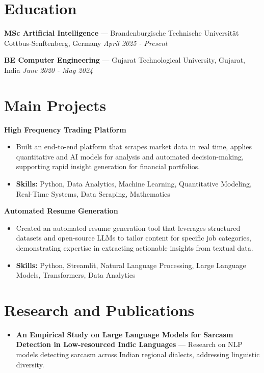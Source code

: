 \documentclass[a4paper,10pt]{article}
\begin{document}
\section*{Education}
\textbf{MSc Artificial Intelligence} — Brandenburgische Technische Universität Cottbus-Senftenberg, Germany \hfill \textit{April 2025 - Present}\par
\vspace{1.5pt}
\textbf{BE Computer Engineering} — Gujarat Technological University, Gujarat, India \hfill \textit{June 2020 - May 2024}\par

\section*{Main Projects}
\textbf{High Frequency Trading Platform}\par
\vspace{1pt}
\begin{itemize}
  \item Built an end-to-end platform that scrapes market data in real time, applies quantitative and AI models for analysis and automated decision-making, supporting rapid insight generation for financial portfolios.
  \item \textbf{Skills:} Python, Data Analytics, Machine Learning, Quantitative Modeling, Real-Time Systems, Data Scraping, Mathematics
\end{itemize}
\vspace{3pt}
\textbf{Automated Resume Generation}\par
\vspace{1pt}
\begin{itemize}
  \item Created an automated resume generation tool that leverages structured datasets and open-source LLMs to tailor content for specific job categories, demonstrating expertise in extracting actionable insights from textual data.
  \item \textbf{Skills:} Python, Streamlit, Natural Language Processing, Large Language Models, Transformers, Data Analytics
\end{itemize}

\section*{Research and Publications}
\begin{itemize}
\item \textbf{An Empirical Study on Large Language Models for Sarcasm Detection in Low-resourced Indic Languages} — Research on NLP models detecting sarcasm across Indian regional dialects, addressing linguistic diversity.
\end{itemize}
\end{document}
